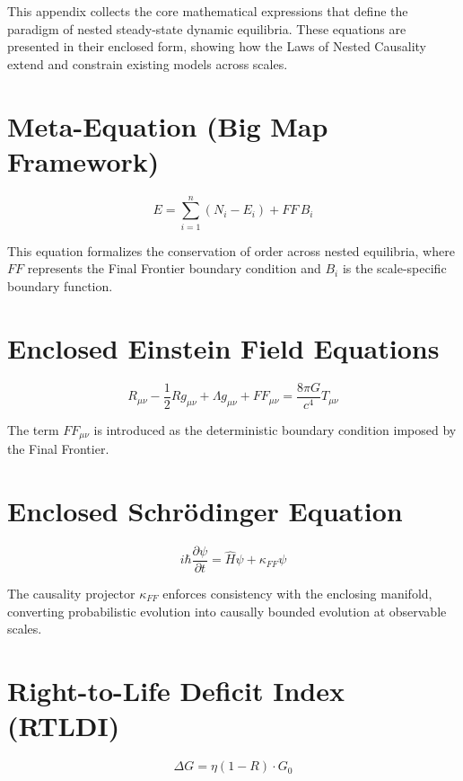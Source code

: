 This appendix collects the core mathematical expressions that define the paradigm of nested steady-state dynamic equilibria. These equations are presented in their enclosed form, showing how the Laws of Nested Causality extend and constrain existing models across scales.

\section{Meta-Equation (Big Map Framework)}

\begin{equation}
E = \sum_{i=1}^n (N_i - E_i) + FF \, B_i
\end{equation}

This equation formalizes the conservation of order across nested equilibria, where \(FF\) represents the Final Frontier boundary condition and $B_i$ is the scale-specific boundary function.

\section{Enclosed Einstein Field Equations}

\begin{equation}
R_{\mu\nu} - \frac{1}{2} R g_{\mu\nu} + \Lambda g_{\mu\nu} + FF_{\mu\nu} = \frac{8\pi G}{c^4} T_{\mu\nu}
\end{equation}

The term $FF_{\mu\nu}$ is introduced as the deterministic boundary condition imposed by the Final Frontier.

\section{Enclosed Schrödinger Equation}

\begin{equation}
i \hbar \frac{\partial \psi}{\partial t} = \hat{H} \psi + \kappa_{FF} \psi
\end{equation}

The causality projector $\kappa_{FF}$ enforces consistency with the enclosing manifold, converting probabilistic evolution into causally bounded evolution at observable scales.

\section{Right-to-Life Deficit Index (RTLDI)}

\begin{equation}
\Delta G = \eta (1 - R) \cdot G_0
\end{equation}

